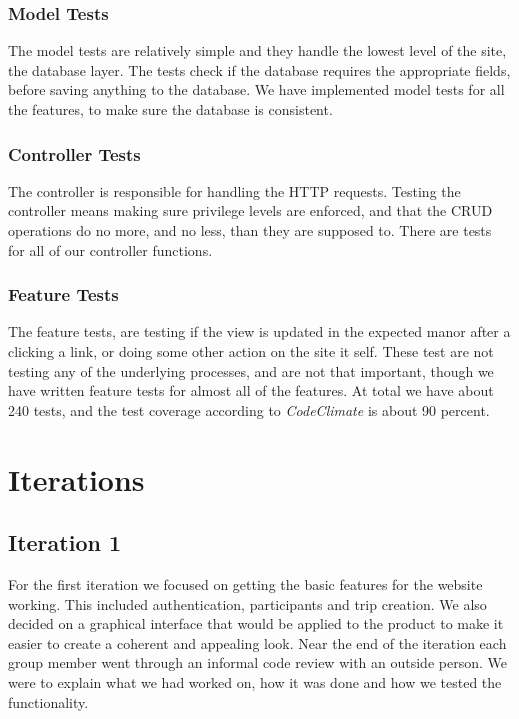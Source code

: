 \documentclass[a4paper]{article}
\begin{document}
\subsubsection{Model Tests}
The model tests are relatively simple and they handle the lowest level of the site, the database layer. The tests check if the database requires the appropriate fields, before saving anything to the database. We have implemented model tests for all the features, to make sure the database is consistent.
\\

\subsubsection{Controller Tests}
The controller is responsible for handling the HTTP requests. Testing the controller means making sure privilege levels are enforced, and that the CRUD operations do no more, and no less, than they are supposed to. There are tests for all of our controller functions.
\\

\subsubsection{Feature Tests}
The feature tests, are testing if the view is updated in the expected manor after a clicking a link, or doing some other action on the site it self. These test are not testing any of the underlying processes, and are not that important, though we have written feature tests for almost all of the features. 
At total we have about 240 tests, and the test coverage according to \textit{CodeClimate} is about 90 percent. \\

\section{Iterations}
\subsection{Iteration 1}
For the first iteration we focused on getting the basic features for the website working. This included authentication, participants and trip creation. We also decided on a graphical interface that would be applied to the product to make it easier to create a coherent and appealing look. Near the end of the iteration each group member went through an informal code review with an outside person. We were to explain what we had worked on, how it was done and how we tested the functionality.\\
\end{document}
